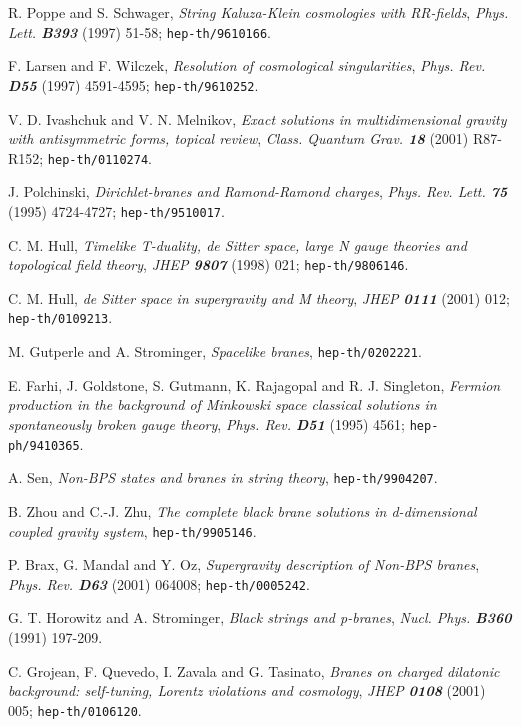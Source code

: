 \documentclass[a4paper,aps,nofootinbib,showpacs,preprint]{revtex4}
\begin{document}
\begin{thebibliography}{99}
    R. Poppe and S. Schwager,
    {\sl String Kaluza-Klein cosmologies with RR-fields},
    {\it Phys. Lett. \bf B393} (1997) 51-58;
    {\tt hep-th/9610166}.

    F. Larsen and F. Wilczek,
    {\sl Resolution of cosmological singularities},
    {\it Phys. Rev. \bf D55} (1997) 4591-4595;
    {\tt hep-th/9610252}.

    V. D. Ivashchuk and V. N. Melnikov,
    {\sl Exact solutions in multidimensional gravity with antisymmetric
         forms, topical review},
    {\it Class. Quantum Grav. \bf 18} (2001) R87-R152;
    {\tt hep-th/0110274}.

    J. Polchinski,
    {\sl Dirichlet-branes and Ramond-Ramond charges},
    {\it Phys. Rev. Lett. \bf 75} (1995) 4724-4727;
    {\tt hep-th/9510017}.

    C. M. Hull,
    {\sl Timelike T-duality, de Sitter space, large N gauge theories
         and topological field theory},
    {\it JHEP \bf 9807} (1998) 021;
    {\tt hep-th/9806146}.

    C. M. Hull,
    {\sl de Sitter space in supergravity and M theory},
    {\it JHEP \bf 0111} (2001) 012;
    {\tt hep-th/0109213}.

    M. Gutperle and A. Strominger,
    {\sl Spacelike branes},
    {\tt hep-th/0202221}.

    E. Farhi, J. Goldstone, S. Gutmann, K. Rajagopal and R. J. Singleton,
    {\sl Fermion production in the background of Minkowski space classical
         solutions in spontaneously broken gauge theory},
    {\it Phys. Rev. \bf D51} (1995) 4561;
    {\tt hep-ph/9410365}.

    A. Sen,
    {\sl Non-BPS states and branes in string theory},
    {\tt hep-th/9904207}.

    B. Zhou and C.-J. Zhu,
    {\sl The complete black brane solutions in d-dimensional
         coupled gravity system},
    {\tt hep-th/9905146}.

    P. Brax, G. Mandal and Y. Oz,
    {\sl Supergravity description of Non-BPS branes},
    {\it Phys. Rev. \bf D63} (2001) 064008;
    {\tt hep-th/0005242}.

    G. T. Horowitz and A. Strominger,
    {\sl Black strings and p-branes},
    {\it Nucl. Phys. \bf B360} (1991) 197-209.

    C. Grojean, F. Quevedo, I. Zavala and G. Tasinato,
    {\sl Branes on charged dilatonic background: self-tuning, Lorentz
         violations and cosmology},
    {\it JHEP \bf 0108} (2001) 005;
    {\tt hep-th/0106120}.


\end{thebibliography}
\end{document}

